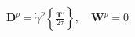 \documentclass[preview]{standalone}
\begin{document}
\begin{align*}
\mathbf{D}^p = \dot{\gamma}^p \left\{ \frac{\tilde{\mathbf{T}}'}{2 \bar{\tau}} \right\}, \quad \mathbf{W}^p = 0
\end{align*}
\end{document}
